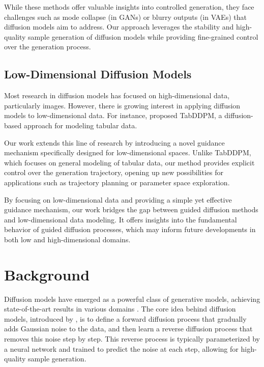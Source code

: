 \documentclass{article} %
\begin{document}
While these methods offer valuable insights into controlled generation, they face challenges such as mode collapse (in GANs) or blurry outputs (in VAEs) that diffusion models aim to address. Our approach leverages the stability and high-quality sample generation of diffusion models while providing fine-grained control over the generation process.

\subsection{Low-Dimensional Diffusion Models}

Most research in diffusion models has focused on high-dimensional data, particularly images. However, there is growing interest in applying diffusion models to low-dimensional data. For instance, \citet{kotelnikov2022tabddpm} proposed TabDDPM, a diffusion-based approach for modeling tabular data.

Our work extends this line of research by introducing a novel guidance mechanism specifically designed for low-dimensional spaces. Unlike TabDDPM, which focuses on general modeling of tabular data, our method provides explicit control over the generation trajectory, opening up new possibilities for applications such as trajectory planning or parameter space exploration.

By focusing on low-dimensional data and providing a simple yet effective guidance mechanism, our work bridges the gap between guided diffusion methods and low-dimensional data modeling. It offers insights into the fundamental behavior of guided diffusion processes, which may inform future developments in both low and high-dimensional domains.

\section{Background}
\label{sec:background}

Diffusion models have emerged as a powerful class of generative models, achieving state-of-the-art results in various domains \cite{yang2023diffusion}. The core idea behind diffusion models, introduced by \citet{sohl-dickstein15}, is to define a forward diffusion process that gradually adds Gaussian noise to the data, and then learn a reverse diffusion process that removes this noise step by step. This reverse process is typically parameterized by a neural network and trained to predict the noise at each step, allowing for high-quality sample generation.
\end{document}
